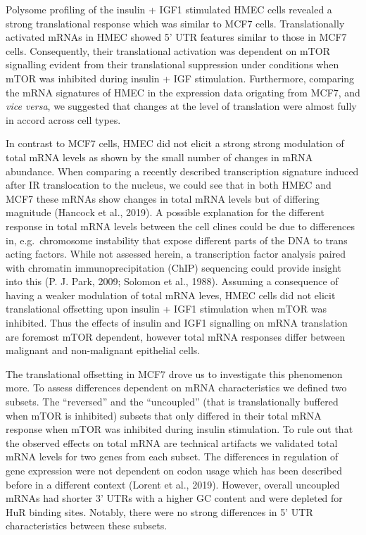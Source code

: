 \documentclass[12pt,openany]{book}
\begin{document}
Polysome profiling of the insulin + IGF1 stimulated HMEC cells revealed
a strong translational response which was similar to MCF7 cells.
Translationally activated mRNAs in HMEC showed 5' UTR features similar
to those in MCF7 cells. Consequently, their translational activation was
dependent on mTOR signalling evident from their translational
suppression under conditions when mTOR was inhibited during insulin +
IGF stimulation. Furthermore, comparing the mRNA signatures of HMEC in
the expression data origating from MCF7, and \emph{vice versa}, we
suggested that changes at the level of translation were almost fully in
accord across cell types.

In contrast to MCF7 cells, HMEC did not elicit a strong strong
modulation of total mRNA levels as shown by the small number of changes
in mRNA abundance. When comparing a recently described transcription
signature induced after IR translocation to the nucleus, we could see
that in both HMEC and MCF7 these mRNAs show changes in total mRNA levels
but of differing magnitude (Hancock et al., 2019). A possible
explanation for the different response in total mRNA levels between the
cell clines could be due to differences in, e.g.~chromosome instability
that expose different parts of the DNA to trans acting factors. While
not assessed herein, a transcription factor analysis paired with
chromatin immunoprecipitation (ChIP) sequencing could provide insight
into this (P. J. Park, 2009; Solomon et al., 1988). Assuming a
consequence of having a weaker modulation of total mRNA leves, HMEC
cells did not elicit translational offsetting upon insulin + IGF1
stimulation when mTOR was inhibited. Thus the effects of insulin and
IGF1 signalling on mRNA translation are foremost mTOR dependent, however
total mRNA responses differ between malignant and non-malignant
epithelial cells.

The translational offsetting in MCF7 drove us to investigate this
phenomenon more. To assess differences dependent on mRNA characteristics
we defined two subsets. The ``reversed'' and the ``uncoupled'' (that is
translationally buffered when mTOR is inhibited) subsets that only
differed in their total mRNA response when mTOR was inhibited during
insulin stimulation. To rule out that the observed effects on total mRNA
are technical artifacts we validated total mRNA levels for two genes
from each subset. The differences in regulation of gene expression were
not dependent on codon usage which has been described before in a
different context (Lorent et al., 2019). However, overall uncoupled
mRNAs had shorter 3' UTRs with a higher GC content and were depleted for
HuR binding sites. Notably, there were no strong differences in 5' UTR
characteristics between these subsets.
\end{document}
